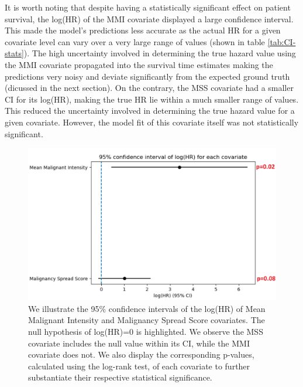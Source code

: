 \documentclass{l4proj}
\begin{document}
It is worth noting that despite having a statistically significant effect on patient survival, the log(HR) of the MMI covariate displayed a large confidence interval. This made the model's predictions less accurate as the actual HR for a given covariate level can vary over a very large range of values (shown in table \ref{tab:CI-stats}). The high uncertainty involved in determining the true hazard value using the MMI covariate propagated into the survival time estimates making the predictions very noisy and deviate significantly from the expected ground truth (dicussed in the next section). On the contrary, the MSS covariate had a smaller CI for its log(HR), making the true HR lie within a much smaller range of values. This reduced the uncertainty involved in determining the true hazard value for a given covariate. However, the model fit of this covariate itself was not statistically significant.

\begin{figure}[h]
    \centering
    \includegraphics[scale=0.4]{images/95-CI-Interval.png}
    \caption{We illustrate the 95\% confidence intervals of the log(HR) of Mean Malignant Intensity and Malignancy Spread Score covariates. The null hypothesis of log(HR)=0 is highlighted. We observe the MSS covariate includes the null value within its CI, while the MMI covariate does not. We also display the corresponding p-values, calculated using the log-rank test, of each covariate to further substantiate their respective statistical significance.}
    \label{fig:95-CI-interval}
\end{figure}
\end{document}

